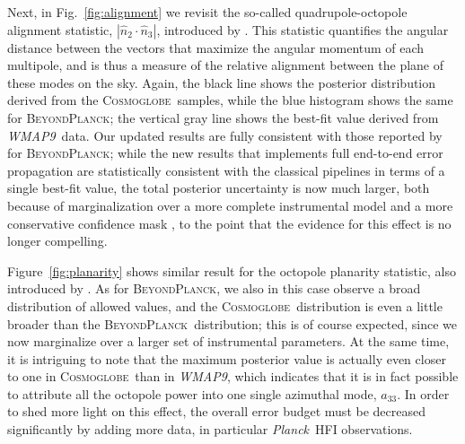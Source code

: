 \documentclass[twocolumn]{../../common/aa}
\def\WMAPnine{\emph{WMAP9}}
\def\Planck{\emph{Planck}}
\newcommand{\bp}{\textsc{BeyondPlanck}}
\newcommand{\cosmoglobe}{\textsc{Cosmoglobe}}
\begin{document}
Next, in Fig.~\ref{fig:alignment} we revisit the so-called quadrupole-octopole alignment statistic, $|\hat{n}_2\cdot \hat{n}_3|$, introduced by \citet{deOliveira-Costa2004}. This statistic quantifies the angular distance between the vectors that maximize the angular momentum of each multipole, and is thus a measure of the relative alignment between the plane of these modes on the sky. Again, the black line shows the posterior distribution derived from the \cosmoglobe\ samples, while the blue histogram shows the same for \bp; the vertical gray line shows the best-fit value derived from \WMAPnine\ data. Our updated results are fully consistent with those reported by \citet{bp11} for \bp; while the new results that implements full end-to-end error propagation are statistically consistent with the classical pipelines in terms of a single best-fit value, the total posterior uncertainty is now much larger, both because of marginalization over a more complete instrumental model and a more conservative confidence mask \citep{bp11}, to the point that the evidence for this effect is no longer compelling. 

Figure~\ref{fig:planarity} shows similar result for the octopole planarity statistic, also introduced by \citet{deOliveira-Costa2004}. As for \bp, we also in this case observe a broad distribution of allowed values, and the \cosmoglobe\ distribution is even a little broader than the \bp\ distribution; this is of course expected, since we now marginalize over a larger set of instrumental parameters. At the same time, it is intriguing to note that the maximum posterior value is actually even closer to one in \cosmoglobe\ than in \WMAPnine, which indicates that it is in fact possible to attribute all the octopole power into one single azimuthal mode, $a_{33}$. In order to shed more light on this effect, the overall error budget must be decreased significantly by adding more data, in particular \Planck\ HFI observations. 
\end{document}
